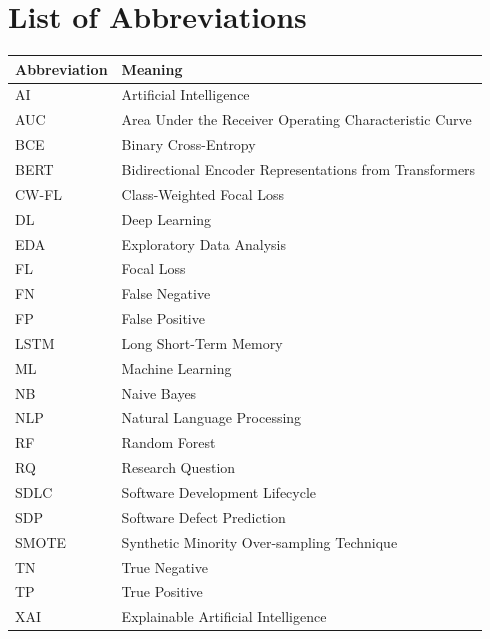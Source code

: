 \documentclass[12pt,a4paper,oneside]{report}
\begin{document}
\listoftables
{}
\clearpage

\chapter*{List of Abbreviations}

\begin{tabular}{L{30mm}L{120mm}}
  \toprule
  \textbf{Abbreviation} & \textbf{Meaning} \\
  \midrule
  AI    & Artificial Intelligence \\
  AUC   & Area Under the Receiver Operating Characteristic Curve \\
  BCE   & Binary Cross-Entropy \\
  BERT  & Bidirectional Encoder Representations from Transformers \\
  CW-FL & Class-Weighted Focal Loss \\
  DL    & Deep Learning \\
  EDA   & Exploratory Data Analysis \\
  FL    & Focal Loss \\
  FN    & False Negative \\
  FP    & False Positive \\
  LSTM  & Long Short-Term Memory \\
  ML    & Machine Learning \\
  NB    & Naive Bayes \\
  NLP   & Natural Language Processing \\
  RF    & Random Forest \\
  RQ    & Research Question \\
  SDLC  & Software Development Lifecycle \\
  SDP   & Software Defect Prediction \\
  SMOTE & Synthetic Minority Over-sampling Technique \\
  TN    & True Negative \\
  TP    & True Positive \\
  XAI   & Explainable Artificial Intelligence \\
  \bottomrule
\end{tabular}
\clearpage

\end{document}
